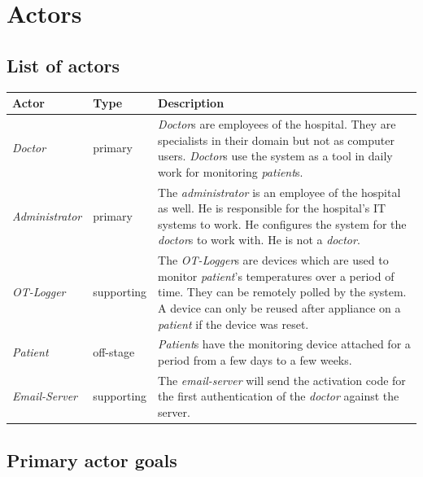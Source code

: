 \documentclass[fontsize=12pt,
               paper=a4,
               twoside=false,
               parskip=half,
               ]{scrartcl}
\begin{document}
\newcommand{\doctitle}{Use Case Model}


\tableofcontents


\section{Actors}

\subsection{List of actors}

\begin{tabular}{llp{9cm}}
\toprule
\textbf{Actor} & \textbf{Type} & \textbf{Description} \\ 
\midrule
\emph{Doctor} & primary & \emph{Doctor}s are employees of the hospital. They are specialists
in their domain but not as computer users. \emph{Doctor}s use the system as a tool
in daily work for monitoring \emph{patient}s. \\ 
\emph{Administrator} & primary & The \emph{administrator} is an employee of the hospital as
well. He is responsible for the hospital's IT systems to work. He configures
the system for the \emph{doctor}s to work with. He is not a \emph{doctor}. \\ 
\emph{OT-Logger} & supporting & The \emph{OT-Logger}s are devices which are used to monitor
\emph{patient}'s temperatures over a period of time. They can be remotely polled by 
the system. A device can only be reused after appliance on a \emph{patient} if the device was reset.\\ 
\emph{Patient} & off-stage & \emph{Patient}s have the monitoring device attached for a period from a few days to a few weeks. \\
\emph{Email-Server} & supporting & The \emph{email-server} will send the activation code for the first authentication of the \emph{doctor} against the server.

\\ 
\bottomrule 
\end{tabular} 

\subsection{Primary actor goals}
\end{document}
